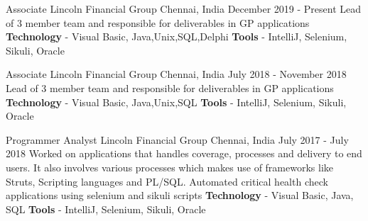 

\begin{cventries}

  \cventry
    {Associate} %
    {Lincoln Financial Group} %
    {Chennai, India} %
    {December 2019 - Present} %
    {
        Lead of 3 member team and responsible for deliverables in GP applications
        \newline
        \textbf{Technology} - Visual Basic, Java,Unix,SQL,Delphi \newline
        \textbf{Tools} - IntelliJ, Selenium, Sikuli, Oracle
    }

  \cventry
    {Associate} %
    {Lincoln Financial Group} %
    {Chennai, India} %
    {July 2018 - November 2018} %
    {
        Lead of 3 member team and responsible for deliverables in GP applications
        \newline
        \textbf{Technology} - Visual Basic, Java,Unix,SQL \newline
        \textbf{Tools} - IntelliJ, Selenium, Sikuli, Oracle
    }

  \cventry
    {Programmer Analyst} %
    {Lincoln Financial Group} %
    {Chennai, India} %
    {July 2017 - July 2018} %
    {
        Worked on applications that handles coverage, processes and delivery to end users. It also involves various processes which makes use of frameworks like Struts, Scripting languages and PL/SQL.
        \newline
        Automated critical health check applications using selenium and sikuli scripts\newline
        \textbf{Technology} - Visual Basic, Java, SQL \newline
        \textbf{Tools} - IntelliJ, Selenium, Sikuli, Oracle
    }


\end{cventries}
